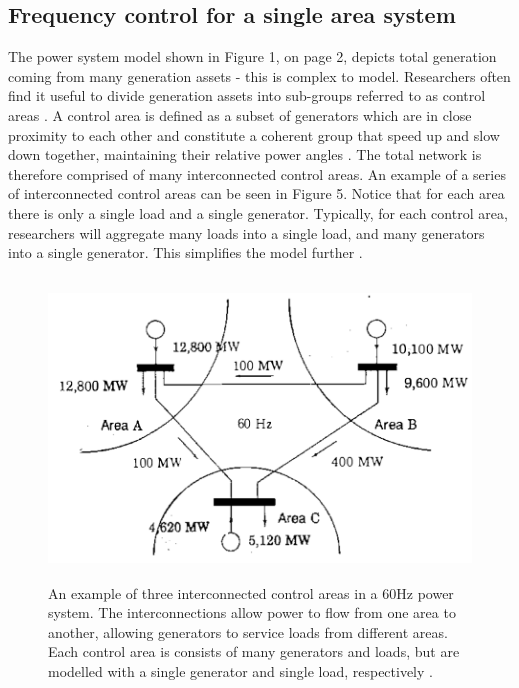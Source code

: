 \documentclass[12pt, a4paper]{article}
\begin{document}
\subsection{Frequency control for a single area system}
The power system model shown in Figure 1, on page 2, depicts total generation coming from many generation assets - this is complex to model. Researchers often find it useful to divide generation assets into sub-groups referred to as control areas \cite{Kothari2011}. A control area is defined as a subset of generators which are in close proximity to each other and constitute a coherent group that speed up and slow down together, maintaining their relative power angles \cite{Kothari2011}. The total network is therefore comprised of many interconnected control areas. An example of a series of interconnected control areas can be seen in Figure 5. Notice that for each area there is only a single load and a single generator. Typically, for each control area, researchers will aggregate many loads into a single load, and many generators into a single generator. This simplifies the model further \cite{Grainger1994}.
\begin{figure}[h]
	\centering
	\includegraphics[height=8cm]{multiple_area_system}
	\caption{An example of three interconnected control areas in a 60$\si{\hertz}$ power system. The interconnections allow power to flow from one area to another, allowing generators to service loads from different areas. Each control area is consists of many generators and loads, but are modelled with a single generator and single load, respectively \cite{Grainger1994}.}
\end{figure}
\end{document}

